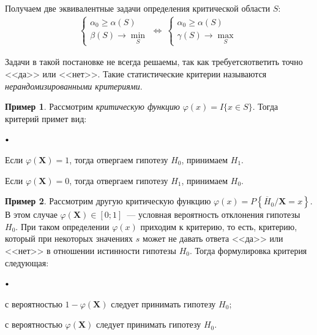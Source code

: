 \documentclass[oneside,final,14pt]{extreport}
\theoremstyle{plain}
\theoremstyle{definition}
\newtheorem*{exmp}{Пример}
\theoremstyle{named}
\newcommand\sbullet[1][.5]{\mathbin{\vcenter{\hbox{\scalebox{#1}{$\bullet$}}}}}
\newenvironment{compactlist}{
\begin{list}{{$\sbullet[.75]$}}{
\setlength\partopsep{0pt}
\setlength\parskip{0pt}
\setlength\parsep{0pt}
\setlength\topsep{0pt}
\setlength\itemsep{0pt}
}
}{
\end{list}
}
\begin{document}
Получаем две эквивалентные задачи определения критической области $S$:
\begin{equation*}
    \begin{array}{l}
    \left\{\begin{array}{l}
    \alpha_{0} \geqslant \alpha(S) \\
    \beta(S) \rightarrow \min\limits_{S}
    \end{array}\right.
    \Leftrightarrow~
    \left\{\begin{array}{l}
    \alpha_{0} \geqslant \alpha(S) \\
    \gamma(S) \rightarrow \max\limits_{S}
    \end{array}\right.
    \end{array}
\end{equation*}

Задачи в такой постановке не всегда решаемы, так как требуетсяответить точно <<да>> или <<нет>>. Такие статистические критерии называются {\it нерандомизированными критериями}.

\begin{exmp}
Рассмотрим {\it критическую функцию} $\varphi(x)=I\{x \in S\}$. Тогда критерий примет вид:
\begin{compactlist}
    \item Если $\varphi\left(\mathbf{X}\right)=1$, тогда отвергаем гипотезу $H_0$, принимаем $H_1$.
    \item Если $\varphi\left(\mathbf{X}\right)=0$, тогда отвергаем гипотезу $H_1$, принимаем $H_0$.
\end{compactlist}
\end{exmp}

\begin{exmp}
Рассмотрим другую критическую функцию $\varphi(x)=P\left\{\overline{H}_{0} / \mathbf{X}=x\right\}$. В этом случае $\varphi\left(\mathbf{X}\right) \in[0;1]$~--- условная вероятность отклонения гипотезы $H_0$. При таком определении $\varphi(x)$ приходим к { критерию}, то есть, критерию, который при некоторых значениях $s$ может не давать ответа <<да>> или <<нет>> в отношении истинности гипотезы $H_0$. Тогда формулировка критерия следующая:
\begin{compactlist}
    \item с вероятностью $1 - \varphi\left(\mathbf{X}\right)$ следует принимать гипотезу $H_0$;
    \item с вероятностью $\varphi\left(\mathbf{X}\right)$ следует принимать гипотезу $H_0$.
\end{compactlist}
\end{exmp}
\end{document}
